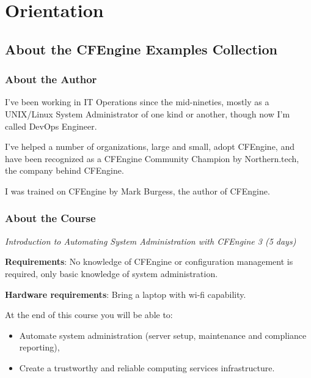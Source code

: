



\chapter{Orientation}





\section{About the CFEngine Examples Collection}





\subsection{About the Author}

I've been working in IT Operations since the mid-nineties, mostly as a
UNIX/Linux System Administrator of one kind or another, though now I'm
called DevOps Engineer.

I've helped a number of organizations, large and small, adopt CFEngine,
and have been recognized as a CFEngine Community Champion by Northern.tech,
the company behind CFEngine.

I was trained on CFEngine by Mark Burgess, the author of CFEngine.





\subsection{About the Course}

\emph{Introduction to Automating System Administration with CFEngine 3 (5 days)}

\textbf{Requirements}: No knowledge of CFEngine or configuration management is
required, only basic knowledge of system administration.

\textbf{Hardware requirements}: Bring a laptop with wi-fi capability.

At the end of this course you will be able to:

\begin{itemize}
\item{} Automate system administration (server setup, maintenance and compliance reporting),
\item{} Create a trustworthy and reliable computing services infrastructure.
\end{itemize}





